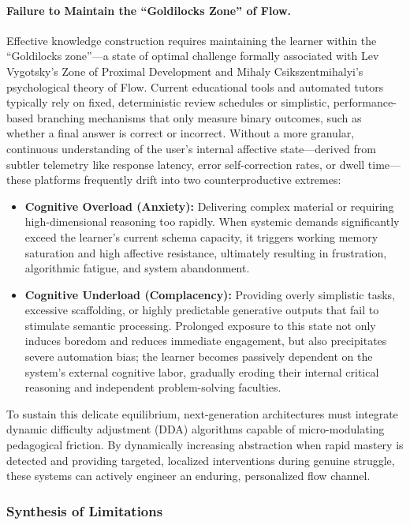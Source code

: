 \paragraph{Failure to Maintain the ``Goldilocks Zone'' of Flow.} Effective knowledge construction requires maintaining the learner within the ``Goldilocks zone''---a state of optimal challenge formally associated with Lev Vygotsky's Zone of Proximal Development and Mihaly Csikszentmihalyi's psychological theory of Flow.  Current educational tools and automated tutors typically rely on fixed, deterministic review schedules or simplistic, performance-based branching mechanisms that only measure binary outcomes, such as whether a final answer is correct or incorrect. Without a more granular, continuous understanding of the user's internal affective state---derived from subtler telemetry like response latency, error self-correction rates, or dwell time---these platforms frequently drift into two counterproductive extremes:

\begin{itemize}
\item \textbf{Cognitive Overload (Anxiety):} Delivering complex material or requiring high-dimensional reasoning too rapidly. When systemic demands significantly exceed the learner's current schema capacity, it triggers working memory saturation and high affective resistance, ultimately resulting in frustration, algorithmic fatigue, and system abandonment.
\item \textbf{Cognitive Underload (Complacency):} Providing overly simplistic tasks, excessive scaffolding, or highly predictable generative outputs that fail to stimulate semantic processing. Prolonged exposure to this state not only induces boredom and reduces immediate engagement, but also precipitates severe automation bias; the learner becomes passively dependent on the system's external cognitive labor, gradually eroding their internal critical reasoning and independent problem-solving faculties.
\end{itemize}

To sustain this delicate equilibrium, next-generation architectures must integrate dynamic difficulty adjustment (DDA) algorithms capable of micro-modulating pedagogical friction. By dynamically increasing abstraction when rapid mastery is detected and providing targeted, localized interventions during genuine struggle, these systems can actively engineer an enduring, personalized flow channel.

\subsubsection*{Synthesis of Limitations}

